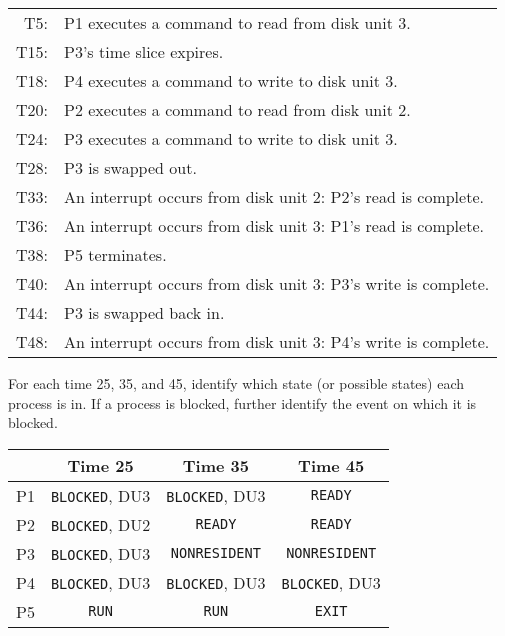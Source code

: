 \documentclass[11pt,largemargins]{homework}
\begin{document}

\begin{tabular}{r l}
    T5:  & P1 executes a command to read from disk unit 3.               \\
    T15: & P3's time slice expires.                                      \\
    T18: & P4 executes a command to write to disk unit 3.                \\
    T20: & P2 executes a command to read from disk unit 2.               \\
    T24: & P3 executes a command to write to disk unit 3.                \\
    T28: & P3 is swapped out.                                            \\
    T33: & An interrupt occurs from disk unit 2: P2's read is complete.  \\
    T36: & An interrupt occurs from disk unit 3: P1's read is complete.  \\
    T38: & P5 terminates.                                                \\
    T40: & An interrupt occurs from disk unit 3: P3's write is complete. \\
    T44: & P3 is swapped back in.                                        \\
    T48: & An interrupt occurs from disk unit 3: P4's write is complete. \\
\end{tabular}

For each time 25, 35, and 45, identify which state (or possible states)
each process is in. If a process is
blocked, further identify the event on which it is blocked.

\vspace{.5in}
\begin{tabular}{|c|c|c|c|}\hline %
        & Time 25               & Time 35               & Time
    45
    \\\hline %

    P1 & \texttt{BLOCKED}, DU3 & \texttt{BLOCKED}, DU3
        & \texttt{READY}
    \\\hline %

    P2 & \texttt{BLOCKED}, DU2 & \texttt{READY}
        & \texttt{READY}
    \\\hline %

    P3 & \texttt{BLOCKED}, DU3 & \texttt{NONRESIDENT}  &
    \texttt{NONRESIDENT}
    \\\hline %

    P4 & \texttt{BLOCKED}, DU3 & \texttt{BLOCKED}, DU3 &
    \texttt{BLOCKED}, DU3
    \\\hline %

    P5 & \texttt{RUN}          & \texttt{RUN}          &
    \texttt{EXIT}
    \\\hline %
\end{tabular}
\end{document}
